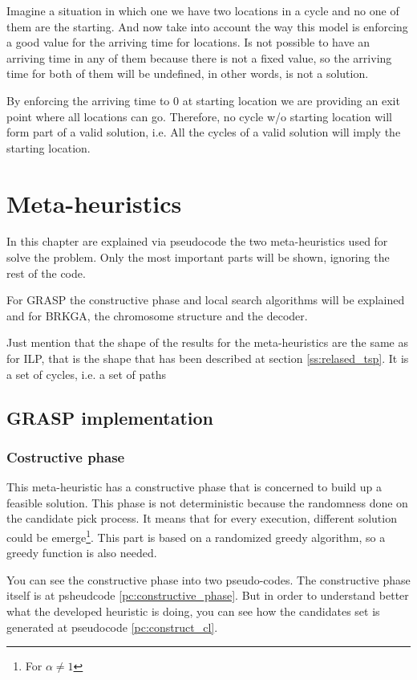 \documentclass[]{report}
\begin{document}
Imagine a situation in which one we have two locations in a cycle and no one of them are the starting. And now take into account the way this model is enforcing a good value for the arriving time for locations. Is not possible to have an arriving time in any of them because there is not a fixed value, so the arriving time for both of them will be undefined, in other words, is not a solution.

By enforcing the arriving time to $0$ at starting location we are providing an exit point where all locations can go. Therefore, no cycle w/o starting location will form part of a valid solution, i.e. All the cycles of a valid solution will imply the starting location.

\chapter{Meta-heuristics}\label{ch:meta_heuristics}

In this chapter are explained via pseudocode the two meta-heuristics used for solve the problem. Only the most important parts will be shown, ignoring the rest of the code.

For GRASP the constructive phase and local search algorithms will be explained and for BRKGA, the chromosome structure and the decoder.

Just mention that the shape of the results for the meta-heuristics are the same as for ILP, that is the shape that has been described at section \ref{ss:relased_tsp}. It is a set of cycles, i.e. a set of paths

\section{GRASP implementation}
\subsection{Costructive phase}
This meta-heuristic has a constructive phase that is concerned to build up a feasible solution. This phase is not deterministic because the randomness done on the candidate pick process. It means that for every execution, different solution could be emerge\footnote{For $\alpha \neq 1$}. This part is based on a randomized greedy algorithm, so a greedy function is also needed.

You can see the constructive phase into two pseudo-codes. The constructive phase itself is at psheudcode \ref{pc:constructive_phase}. But in order to understand better what the developed heuristic is doing, you can see how the candidates set is generated at pseudocode \ref{pc:construct_cl}.
\end{document}
